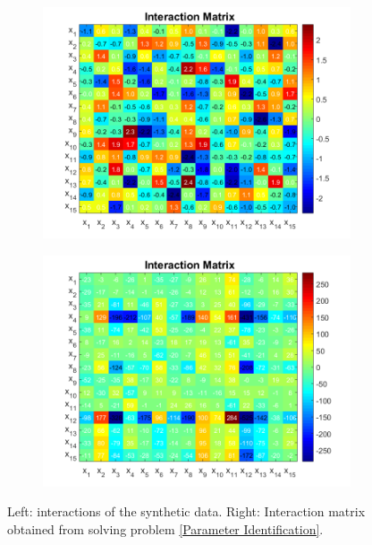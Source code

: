 \documentclass[3p,times]{elsarticle}
\begin{document}
\begin{figure}[h]
	\centering	
\begin{subfigure}[b]{0.45\textwidth}
	\includegraphics[width=\textwidth]{Synthetic_data_no_noise//Interactions_synthetic_data_no_noise}
\end{subfigure}
\begin{subfigure}[b]{0.45\textwidth}
	\includegraphics[width=\textwidth]{Synthetic_data_no_noise//Interactions_221119_no_noise_iter_5}
\end{subfigure}
\caption{Left: interactions of the synthetic data. Right: Interaction matrix obtained from solving problem \eqref{Parameter Identification}.}
\label{Comparison Interaction Matrices}
\end{figure}
\end{document}
